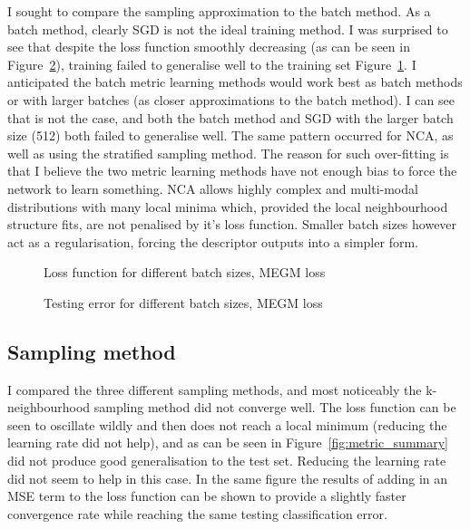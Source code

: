 I sought to compare the sampling approximation to the batch method.
As a batch method, clearly \gls{SGD} is not the ideal training method. I was
surprised to see that despite the loss function smoothly decreasing (as can be
seen in Figure~\ref{fig:metric_megm_test}), training failed to generalise well to the training set Figure~\ref{fig:metric_megm_loss}.
I anticipated the batch metric learning methods would work best as batch
methods or with larger batches (as closer approximations to the batch method).
I can see that is not the case, and both the batch method and \gls{SGD} with the
larger batch size (512) both failed to generalise well. The same pattern occurred
for \gls{NCA}, as well as using the stratified sampling method.
The reason for such over-fitting is that I believe the two metric learning
methods have not enough bias to force the network to learn something. \gls{NCA}
allows highly complex and multi-modal distributions with many local minima
which, provided the local neighbourhood structure fits, are not penalised by it’s
loss function. Smaller batch sizes however act as a regularisation, forcing the
descriptor outputs into a simpler form.



\begin{figure}[ht]
   
   \caption{Loss function for different batch sizes, MEGM loss}
   \label {fig:metric_megm_loss}
\end{figure}

\begin{figure}[ht]
   
   \caption{Testing error for different batch sizes, MEGM loss}
   \label {fig:metric_megm_test}
\end{figure}



\subsection{Sampling method}

I compared the three different sampling methods, and  most noticeably the k-neighbourhood sampling method did not converge well. The loss function can be seen to oscillate wildly and then does not reach a local minimum (reducing the learning rate did not help), and as can be seen in Figure~\ref{fig:metric_summary} did not produce good generalisation to the test set. Reducing the learning rate did not seem to help in this case. In the same figure the results of adding in an \gls{MSE} term to the loss function can be shown to provide a slightly faster convergence rate while reaching the same testing classification error.


